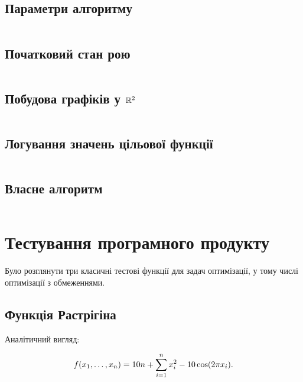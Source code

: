 \documentclass[a4paper, 12pt]{article}
\numberwithin{equation}{section}
\begin{document}
\inputminted[firstline=2,lastline=6]{python}{../code/pso.py}

\subsection{Параметри алгоритму}

\inputminted[firstline=53,lastline=70]{python}{../code/pso.py}

\subsection{Початковий стан рою}

\inputminted[firstline=75,lastline=78]{python}{../code/pso.py}

\subsection{Побудова графіків у \texorpdfstring{$\mathbb{R}^2$}{R2}}

\inputminted[firstline=83,lastline=116]{python}{../code/pso.py}

\subsection{Логування значень цільової функції}

\inputminted[firstline=121,lastline=142]{python}{../code/pso.py}

\subsection{Власне алгоритм}

\inputminted[firstline=147,lastline=167]{python}{../code/pso.py}

\section{Тестування програмного продукту}

Було розглянути три класичні тестові функції для задач оптимізації, у тому числі оптимізації з обмеженнями.

\subsection{Функція Растрігіна}

Аналітичний вигляд:

\begin{equation}
    f(x_1, \ldots, x_n) = 10 n + \operatorname*{\sum}_{i = 1}^n x_i^2 - 10 \cos(2 \pi x_i).
\end{equation}
\end{document}
